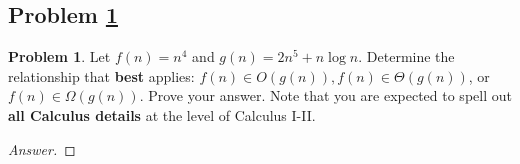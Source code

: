 \documentclass[11pt]{article}
\theoremstyle{definition}
\theoremstyle{definition}
\newtheorem{required}{Problem}
\theoremstyle{definition}
\begin{document}
\subsection{Problem \ref{Asymptotics}}
\begin{required} \label{Asymptotics}
Let $f(n) = n^4$ and $g(n) = 2n^5+n\log n$. Determine the relationship that \textbf{best} applies: $f(n) \in O(g(n)), f(n) \in \Theta(g(n))$, or $f(n) \in \Omega(g(n))$. Prove your answer. Note that you are expected to spell out \textbf{all Calculus details} at the level of Calculus I-II.
\end{required}



\begin{proof}[Answer]
\end{proof}





\end{document}
